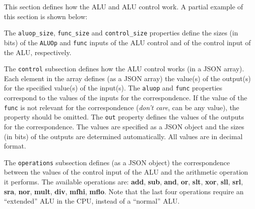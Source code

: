 \documentclass[11pt,a4paper,twoside,titlepage]{report}
\begin{document}
This section defines how the ALU and ALU control work.
A partial example of this section is shown below:



The \verb+aluop_size+, \verb+func_size+ and \verb+control_size+ properties
define the sizes (in bits) of the \verb+ALUOp+ and \verb+func+ inputs of the
ALU control and of the control input of the ALU, respectively.

The \verb+control+ subsection defines how the ALU control works (in a JSON array).
Each element in the array defines (as a JSON array) the value(s) of the output(s)
for the specified value(s) of the input(s).
The \verb+aluop+ and \verb+func+ properties correspond to the values of the
inputs for the correspondence. If the value of the \verb+func+ is not relevant
for the correspondence (\emph{don't care}, can be any value), the property 
should be omitted.
The \verb+out+ property defines the values of the outputs for the correspondence.
The values are specified as a JSON object and the sizes (in bits) of the outputs
are determined automatically.
All values are in decimal format.

The \verb+operations+ subsection defines (as a JSON object) the correspondence 
between the values of the control input of the ALU and the arithmetic operation 
it performs.
The available operations are: \textbf{add}, \textbf{sub}, \textbf{and}, \textbf{or},
\textbf{slt}, \textbf{xor}, \textbf{sll}, \textbf{srl}, \textbf{sra}, \textbf{nor},
\textbf{mult}, \textbf{div}, \textbf{mfhi}, \textbf{mflo}.
Note that the last four operations require an ``extended'' ALU in the CPU, instead 
of a ``normal'' ALU.
\end{document}
